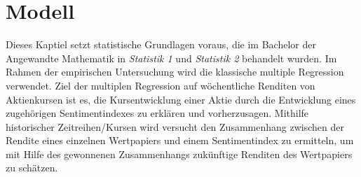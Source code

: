 \section{Modell} 

Dieses Kaptiel setzt statistische Grundlagen voraus, die im Bachelor der Angewandte Mathematik in \textit{Statistik 1} und \textit{Statistik 2} behandelt wurden. 
Im Rahmen der empirischen Untersuchung wird die klassische multiple Regression verwendet. Ziel der multiplen Regression auf wöchentliche Renditen von Aktienkursen ist es, die Kursentwicklung einer Aktie durch die Entwicklung eines zugehörigen Sentimentindexes zu erklären und vorherzusagen. Mithilfe historischer Zeitreihen/Kursen wird versucht den Zusammenhang zwischen der Rendite eines einzelnen Wertpapiers und einem Sentimentindex zu ermitteln, um mit Hilfe des gewonnenen Zusammenhangs zukünftige Renditen des Wertpapiers zu schätzen. \\


